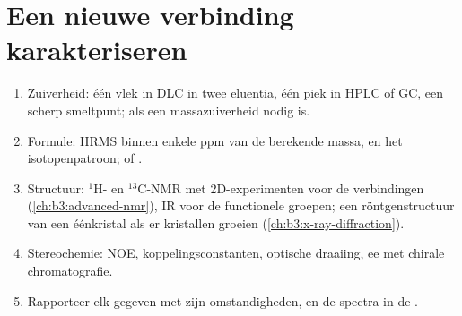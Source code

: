 \section{Een nieuwe verbinding karakteriseren}

\begin{method}\label{met:b3:lab-techniques-3:characterise}
\begin{enumerate}
  \item Zuiverheid: één vlek in DLC in twee eluentia, één piek in HPLC of
        GC, een scherp smeltpunt;  als een
        massazuiverheid nodig is.
  \item Formule: HRMS binnen enkele ppm van de berekende massa, en het
        isotopenpatroon; of .
  \item Structuur: $^1$H- en $^{13}$C-NMR met 2D-experimenten voor de verbindingen
        (\cref{ch:b3:advanced-nmr}), IR voor de functionele groepen; een
        röntgenstructuur van een éénkristal als er kristallen groeien
        (\cref{ch:b3:x-ray-diffraction}).
  \item Stereochemie: NOE, koppelingsconstanten, optische draaiing, ee
        met chirale chromatografie.
  \item Rapporteer elk gegeven met zijn omstandigheden, en de spectra in
        de .
\end{enumerate}
\end{method}

